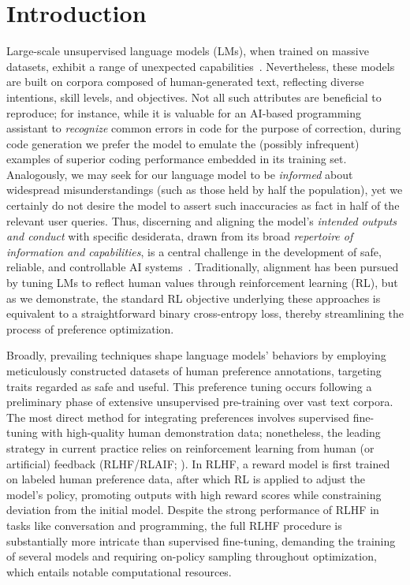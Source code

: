 \section{Introduction}
Large-scale unsupervised language models (LMs), when trained on massive datasets, exhibit a range of unexpected capabilities~\citep{chowdhery2022palm, brown2020language, touvron2023llama,bubeck2023sparks}. Nevertheless, these models are built on corpora composed of human-generated text, reflecting diverse intentions, skill levels, and objectives. Not all such attributes are beneficial to reproduce; for instance, while it is valuable for an AI-based programming assistant to \textit{recognize} common errors in code for the purpose of correction, during code generation we prefer the model to emulate the (possibly infrequent) examples of superior coding performance embedded in its training set. Analogously, we may seek for our language model to be \textit{informed} about widespread misunderstandings (such as those held by half the population), yet we certainly do not desire the model to assert such inaccuracies as fact in half of the relevant user queries. Thus, discerning and aligning the model's \emph{intended outputs and conduct} with specific desiderata, drawn from its broad \textit{repertoire of information and capabilities}, is a central challenge in the development of safe, reliable, and controllable AI systems~\citep{ouyang2022training}. Traditionally, alignment has been pursued by tuning LMs to reflect human values through reinforcement learning (RL), but as we demonstrate, the standard RL objective underlying these approaches is equivalent to a straightforward binary cross-entropy loss, thereby streamlining the process of preference optimization.

Broadly, prevailing techniques shape language models' behaviors by employing meticulously constructed datasets of human preference annotations, targeting traits regarded as safe and useful. This preference tuning occurs following a preliminary phase of extensive unsupervised pre-training over vast text corpora. The most direct method for integrating preferences involves supervised fine-tuning with high-quality human demonstration data; nonetheless, the leading strategy in current practice relies on reinforcement learning from human (or artificial) feedback (RLHF/RLAIF; \citep{christiano2017deep,bai2022constitutional}). In RLHF, a reward model is first trained on labeled human preference data, after which RL is applied to adjust the model's policy, promoting outputs with high reward scores while constraining deviation from the initial model. Despite the strong performance of RLHF in tasks like conversation and programming, the full RLHF procedure is substantially more intricate than supervised fine-tuning, demanding the training of several models and requiring on-policy sampling throughout optimization, which entails notable computational resources.

